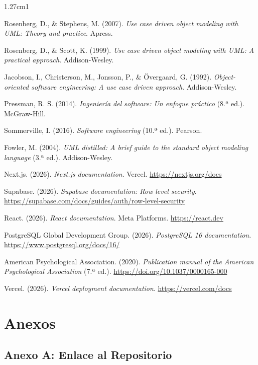 \documentclass[12pt, a4paper]{article}
\begin{document}
\begin{hangparas}{1.27cm}{1}

Rosenberg, D., \& Stephens, M. (2007). \textit{Use case driven object modeling with UML: Theory and practice}. Apress.

Rosenberg, D., \& Scott, K. (1999). \textit{Use case driven object modeling with UML: A practical approach}. Addison-Wesley.

Jacobson, I., Christerson, M., Jonsson, P., \& Övergaard, G. (1992). \textit{Object-oriented software engineering: A use case driven approach}. Addison-Wesley.

Pressman, R. S. (2014). \textit{Ingeniería del software: Un enfoque práctico} (8.ª ed.). McGraw-Hill.

Sommerville, I. (2016). \textit{Software engineering} (10.ª ed.). Pearson.

Fowler, M. (2004). \textit{UML distilled: A brief guide to the standard object modeling language} (3.ª ed.). Addison-Wesley.

Next.js. (2026). \textit{Next.js documentation}. Vercel. \url{https://nextjs.org/docs}

Supabase. (2026). \textit{Supabase documentation: Row level security}. \url{https://supabase.com/docs/guides/auth/row-level-security}

React. (2026). \textit{React documentation}. Meta Platforms. \url{https://react.dev}

PostgreSQL Global Development Group. (2026). \textit{PostgreSQL 16 documentation}. \url{https://www.postgresql.org/docs/16/}

American Psychological Association. (2020). \textit{Publication manual of the American Psychological Association} (7.ª ed.). \url{https://doi.org/10.1037/0000165-000}

Vercel. (2026). \textit{Vercel deployment documentation}. \url{https://vercel.com/docs}

\end{hangparas}

\section{Anexos}

\subsection*{Anexo A: Enlace al Repositorio}
\end{document}
